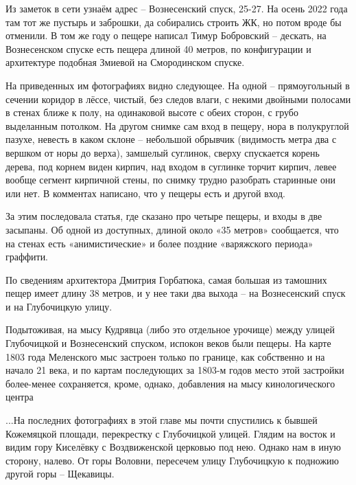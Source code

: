 Из заметок в сети узнаём адрес – Вознесенский спуск, 25-27. На осень 2022 года там тот же пустырь и заброшки, да собирались строить ЖК, но потом вроде бы отменили. В том же году о пещере написал Тимур Бобровский – дескать, на Вознесенском спуске есть пещера длиной 40 метров, по конфигурации и архитектуре подобная Змиевой на Смородинском спуске. 

На приведенных им фотографиях видно следующее. На одной – прямоугольный в сечении коридор в лёссе, чистый, без следов влаги, с некими двойными полосами в стенах ближе к полу, на одинаковой высоте с обеих сторон, с грубо выделанным потолком. На другом снимке сам вход в пещеру, нора в полукруглой пазухе, невесть в каком склоне – небольшой обрывчик (видимость метра два с вершком от норы до верха), замшелый суглинок, сверху спускается корень дерева, под корнем виден кирпич, над входом в суглинке торчит кирпич, левее вообще сегмент кирпичной стены, по снимку трудно разобрать старинные они или нет. В комментах написано, что у пещеры есть и другой вход.

За этим последовала статья, где сказано про четыре пещеры, и входы в две засыпаны. Об одной из доступных, длиной около «35 метров» сообщается, что на стенах есть «анимистические» и более поздние «варяжского периода» граффити.

По сведениям архитектора Дмитрия Горбатюка, 
самая большая из тамошних пещер имеет длину 38 метров, и у нее таки два выхода – на Вознесенский спуск и на Глубочицкую улицу. 

Подытоживая, на мысу Кудрявца (либо это отдельное урочище) между улицей Глубочицкой и Вознесенский спуском, испокон веков были пещеры. На карте 1803 года Меленского мыс застроен только по границе, как собственно и на начало 21 века, и по картам последующих за 1803-м годов место этой застройки более-менее сохраняется, кроме, однако, добавления на мысу кинологического центра
   
...На последних фотографиях в этой главе мы почти спустились к бывшей Кожемяцкой площади, перекрестку с Глубочицкой улицей. Глядим на восток и видим гору Киселёвку с Воздвиженской церковью под нею. Однако нам в иную сторону, налево. От горы Воловни, пересечем улицу Глубочицкую к подножию другой горы – Щекавицы.